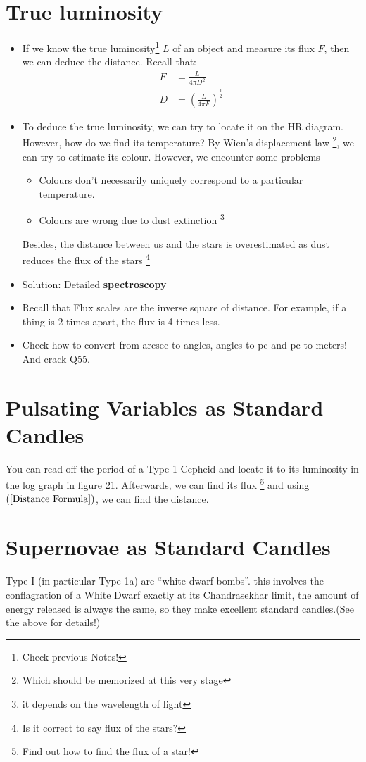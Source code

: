 \documentclass{article}
\begin{document}
\section{True luminosity}
 \begin{itemize}
 \item If we know the true luminosity\footnote{Check previous Notes!} $L$ of an object and measure its flux $F$, then we can deduce the distance. Recall that:
 \begin{align}
 F&=\frac{L}{4 \pi D^2} \\
 D&=\left(\frac{L}{4 \pi F} \right) ^{\frac{1}{2}}
 \label{Distance Formula}
 \end{align}
\item To deduce the true luminosity, we can try to locate it on the HR diagram. However, how do we find its temperature? By Wien's displacement law \footnote{ Which should be memorized at this very stage}, we can try to estimate its colour.
However, we encounter some problems
\begin{itemize}
\item Colours don't necessarily uniquely correspond to a particular temperature.
\item Colours are wrong due to dust extinction \footnote{it depends on the wavelength of light}
\end{itemize}
Besides, the distance between us and the stars is overestimated as dust reduces the flux of the stars \footnote{Is it correct to say flux of the stars?}
\item Solution: Detailed \textbf{spectroscopy}
\item Recall that Flux scales are the inverse square of distance. For example, if a thing is 2 times apart, the flux is 4 times less.
\item Check how to convert from arcsec to angles, angles to pc and pc to meters! And crack Q55.
\end{itemize}
\section{Pulsating Variables as Standard Candles}
You can read off the period of a Type 1 Cepheid and locate it to its luminosity in the log graph in figure 21. Afterwards, we can find its flux \footnote{Find out how to find the flux of a star!} and using $(\ref{Distance Formula})$, we can find the distance.
\section{Supernovae as Standard Candles}
Type I (in particular Type 1a) are “white dwarf bombs”.
this involves the conflagration of a White Dwarf exactly at its Chandrasekhar limit, the amount
of energy released is always the same, so they make excellent standard candles.(See the above for details!)
\end{document}
